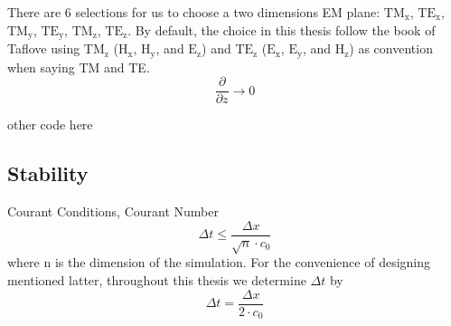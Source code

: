 There are 6 selections for us to choose a two dimensions EM plane: $\mathrm{TM_{x}} $, $\mathrm{TE_{x}}$,
$\mathrm{TM_{y}}$, $\mathrm{TE_{y}}$, $\mathrm{TM_{z}}$, $\mathrm{TE_{z}}$. By default, the choice in this thesis follow
the book of Taflove using $\mathrm{TM_{z}}$ ($\mathrm{H_x}$, $\mathrm{H_y}$, and $\mathrm{E_z}$) and $\mathrm{TE_{z}}$
($\mathrm{E_x}$, $\mathrm{E_y}$, and $\mathrm{H_z}$) as convention when saying TM and TE.
\begin{displaymath}
  \frac{\partial}{\partial z} \rightarrow 0
\end{displaymath}
\begin{code}
  other code
  here
\end{code}




\subsection{Stability}
Courant Conditions, Courant Number
\begin{equation}
  \Delta t \le \frac{\Delta x}{\sqrt{n}\cdot c_0}
\end{equation}
where n is the dimension of the simulation. For the convenience of designing mentioned latter, throughout this thesis we determine
$\Delta t$ by
\begin{equation}
  \Delta t = \frac{\Delta x}{2 \cdot c_0}
\end{equation}
